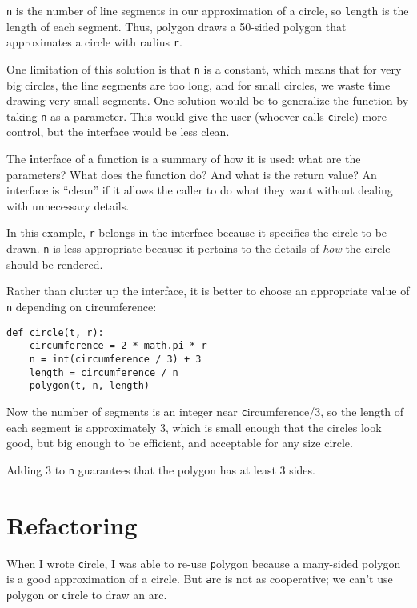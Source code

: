 \documentclass[
DIV=11,
fontsize=12,
twoside,
headinclude=false,
titlepage=firstiscover,
abstract=true,
headsepline=true,
footsepline=true,
chapterprefix=true, %
headings=big,
bibliography=totoc,%
captions=tableheading
]{scrbook}
\theoremstyle{definition}
\begin{document}
{\texttt n} is the number of line segments in our approximation of a circle,
so {\texttt length} is the length of each segment.  Thus, {\texttt polygon}
draws a 50-sided polygon that approximates a circle with radius {\texttt r}.

One limitation of this solution is that {\texttt n} is a constant, which
means that for very big circles, the line segments are too long, and
for small circles, we waste time drawing very small segments.  One
solution would be to generalize the function by taking {\texttt n} as
a parameter.  This would give the user (whoever calls {\texttt circle})
more control, but the interface would be less clean.

The {\textbf interface} of a function is a summary of how it is used: what
are the parameters?  What does the function do?  And what is the return
value?  An interface is ``clean'' if it allows the caller to do
what they want without dealing with unnecessary details.

In this example, {\texttt r} belongs in the interface because it
specifies the circle to be drawn.  {\texttt n} is less appropriate
because it pertains to the details of {\em how} the circle should
be rendered.

Rather than clutter up the interface, it is better
to choose an appropriate value of {\texttt n}
depending on {\texttt circumference}:

\begin{lstlisting}
def circle(t, r):
    circumference = 2 * math.pi * r
    n = int(circumference / 3) + 3
    length = circumference / n
    polygon(t, n, length)
\end{lstlisting}
%
Now the number of segments is an integer near {\texttt circumference/3},
so the length of each segment is approximately 3, which is small
enough that the circles look good, but big enough to be efficient,
and acceptable for any size circle.

Adding 3 to {\texttt n} guarantees that the polygon has at least 3 sides.


\section{Refactoring}
\label{refactoring}

When I wrote {\texttt circle}, I was able to re-use {\texttt polygon}
because a many-sided polygon is a good approximation of a circle.
But {\texttt arc} is not as cooperative; we can't use {\texttt polygon}
or {\texttt circle} to draw an arc.
\end{document}
